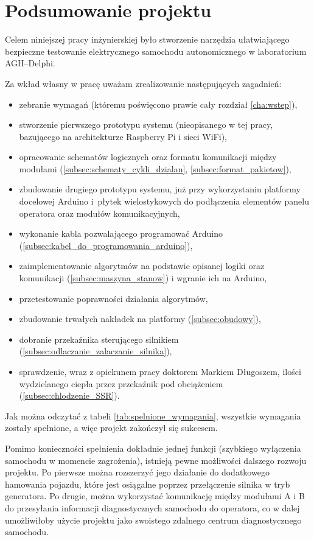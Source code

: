 \chapter{Podsumowanie projektu}
\label{cha:podsumowanie}

Celem niniejszej pracy inżynierskiej było stworzenie narzędzia ułatwiającego bezpieczne testowanie elektrycznego samochodu autonomicznego w laboratorium AGH--Delphi.

Za wkład własny w pracę uważam zrealizowanie następujących zagadnień:

\begin{itemize}
\item zebranie wymagań (któremu poświęcono prawie cały rozdział \ref{cha:wstep}),
\item stworzenie pierwszego prototypu systemu (nieopisanego w tej pracy, bazującego na architekturze Raspberry Pi i sieci WiFi),
\item opracowanie schematów logicznych oraz formatu komunikacji między modułami (\ref{subsec:schematy_cykli_dzialan}, \ref{subsec:format_pakietow}),
\item zbudowanie drugiego prototypu systemu, już przy wykorzystaniu platformy docelowej Arduino i~płytek wielostykowych do podłączenia elementów panelu operatora oraz modułów komunikacyjnych,
\item wykonanie kabla pozwalającego programować Arduino (\ref{subsec:kabel_do_programowania_arduino}),
\item zaimplementowanie algorytmów na podstawie opisanej logiki oraz komunikacji (\ref{subsec:maszyna_stanow}) i wgranie ich na Arduino,
\item przetestowanie poprawności działania algorytmów,
\item zbudowanie trwałych nakładek na platformy (\ref{subsec:obudowy}),
\item dobranie przekaźnika sterującego silnikiem (\ref{subsec:odlaczanie_zalaczanie_silnika}),
\item sprawdzenie, wraz z opiekunem pracy doktorem Markiem Długoszem, ilości wydzielanego ciepła przez przekaźnik pod obciążeniem (\ref{subsec:chlodzenie_SSR}).
\end{itemize}

Jak można odczytać z tabeli \ref{tab:spelnione_wymagania}, wszystkie wymagania zostały spełnione, a więc projekt zakończył się sukcesem.

Pomimo konieczności spełnienia dokładnie jednej funkcji (szybkiego wyłączenia samochodu w momencie zagrożenia), istnieją pewne możliwości dalszego rozwoju projektu. Po pierwsze można rozszerzyć jego działanie do dodatkowego hamowania pojazdu, które jest osiągalne poprzez przełączenie silnika w tryb generatora. Po drugie, można wykorzystać komunikację między modułami A i B do przesyłania informacji diagnostycznych samochodu do operatora, co w dalej umożliwiłoby użycie projektu jako swoistego zdalnego centrum diagnostycznego samochodu.
